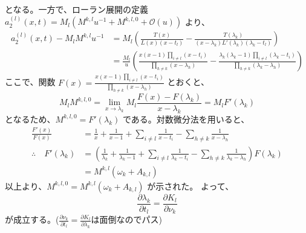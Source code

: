 となる。一方で、ローラン展開の定義 $a_2^{(l)}(x,t) = M_l(M^{k,l}u^{-1} + M^{k,l,0} + \mathcal{O}(u))$ より、
\begin{align*}
    a_2^{(l)}(x,t) - M_l M^{k,l} u^{-1} &= M_l \left( \frac{T(x)}{L(x)(x-t_l)} - \frac{T(\lambda_k)}{(x-\lambda_k)L'(\lambda_k)(\lambda_k-t_l)} \right) \\
    &= \frac{M_l}{u} \left( \frac{x(x-1)\prod_{i \neq l}(x-t_i)}{\prod_{h \neq k}(x-\lambda_h)} - \frac{\lambda_k(\lambda_k-1)\prod_{i \neq l}(\lambda_k-t_i)}{\prod_{h \neq k}(\lambda_k-\lambda_h)} \right)
\end{align*}
ここで、関数 $F(x) = \frac{x(x-1)\prod_{i \neq l}(x-t_i)}{\prod_{h \neq k}(x-\lambda_h)}$ とおくと、
\begin{equation*}
    M_l M^{k,l,0} = \lim_{x \to \lambda_k} M_l \frac{F(x) - F(\lambda_k)}{x-\lambda_k} = M_l F'(\lambda_k)
\end{equation*}
となるため、$M^{k,l,0} = F'(\lambda_k)$ である。対数微分法を用いると、
\begin{align*}
    \frac{F'(x)}{F(x)} &= \frac{1}{x} + \frac{1}{x-1} + \sum_{i \neq l} \frac{1}{x-t_i} - \sum_{h \neq k} \frac{1}{x-\lambda_h} \\
    \therefore \quad F'(\lambda_k) &= \left( \frac{1}{\lambda_k} + \frac{1}{\lambda_k-1} + \sum_{i \neq l} \frac{1}{\lambda_k-t_i} - \sum_{h \neq k} \frac{1}{\lambda_k-\lambda_h} \right) F(\lambda_k) \\
    &= M^{k,l}(\omega_k + A_{k,l})
\end{align*}
以上より、$M^{k,l,0} = M^{k,l}(\omega_k + A_{k,l})$ が示された。
よって、
\begin{equation*}
    \frac{\partial \lambda_k}{\partial t_l} = \frac{\partial K_l}{\partial \nu_k}
\end{equation*}
が成立する。($\frac{\partial \nu_k}{\partial t_l} = \frac{\partial K_l}{\partial \lambda_k}$は面倒なのでパス)